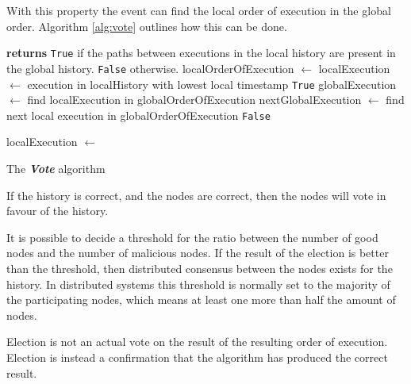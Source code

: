 	With this property the event can find the local order of execution in the global order. Algorithm \ref{alg:vote} outlines how this can be done.
	
	\begin{algorithm}
		\begin{algorithmic}
				\State\hspace{2em}\textbf{returns} \texttt{True} if the paths between executions in the local history are present in the
				\State\hspace{6em}global history. \texttt{False} otherwise.
				\State localOrderOfExecution $\leftarrow$ 
				\State localExecution $\leftarrow$ execution in localHistory with lowest local timestamp
						\State \Return \texttt{True}
					\EndIf
					\State globalExecution $\leftarrow$ find localExecution in globalOrderOfExecution
					\State nextGlobalExecution $\leftarrow$ find next local execution in globalOrderOfExecution
						\State\Return \texttt{False}
					\EndIf
					
					\State localExecution $\leftarrow$ 
				\EndWhile
			\EndFunction
		\end{algorithmic}
		\caption{The \textit{\textbf{Vote}} algorithm}
		\label{alg:vote}
	\end{algorithm}
	
	If the history is correct, and the nodes are correct, then the nodes will vote in favour of the history.
	
	It is possible to decide a threshold for the ratio between the number of good nodes and the number of malicious nodes. If the result of the election is better than the threshold, then distributed consensus between the nodes exists for the history. In distributed systems this threshold is normally set to the majority of the participating nodes, which means at least one more than half the amount of nodes.
	
	\newpar Election is not an actual vote on the result of the resulting order of execution. Election is instead a confirmation that the algorithm has produced the correct result. 
	
